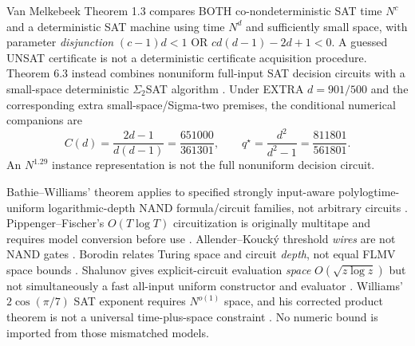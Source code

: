 \documentclass[11pt]{article}
\begin{document}
Van Melkebeek Theorem 1.3 compares BOTH co-nondeterministic SAT time $N^c$ and a deterministic SAT machine using time $N^d$ and sufficiently small space, with parameter \emph{disjunction} $(c-1)d<1$ OR $cd(d-1)-2d+1<0$. A guessed UNSAT certificate is not a deterministic certificate acquisition procedure. Theorem 6.3 instead combines nonuniform full-input SAT decision circuits with a small-space deterministic $\Sigma_2$SAT algorithm \cite{vm}. Under EXTRA $d=901/500$ and the corresponding extra small-space/Sigma-two premises, the conditional numerical companions are
\[
C(d)=\frac{2d-1}{d(d-1)}=\frac{651000}{361301},\qquad
q^\star=\frac{d^2}{d^2-1}=\frac{811801}{561801}.
\]
An $N^{1.29}$ instance representation is not the full nonuniform decision circuit.

Bathie--Williams' theorem applies to specified strongly input-aware polylogtime-uniform logarithmic-depth NAND formula/circuit families, not arbitrary circuits \cite{bw}. Pippenger--Fischer's $O(T\log T)$ circuitization is originally multitape and requires model conversion before use \cite{pf}. Allender--Kouck\'y threshold \emph{wires} are not NAND gates \cite{ak}. Borodin relates Turing space and circuit \emph{depth}, not equal FLMV space bounds \cite{bor}. Shalunov gives explicit-circuit evaluation \emph{space} $O(\sqrt{z\log z})$ but not simultaneously a fast all-input uniform constructor and evaluator \cite{sha}. Williams' $2\cos(\pi/7)$ SAT exponent requires $N^{o(1)}$ space, and his corrected product theorem is not a universal time-plus-space constraint \cite{wil}. No numeric bound is imported from those mismatched models.
\end{document}
